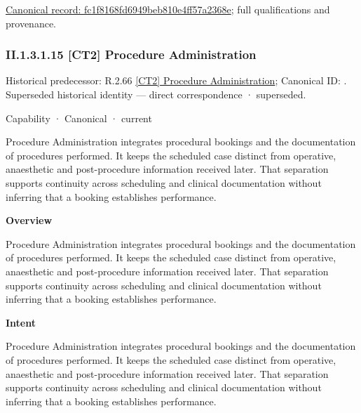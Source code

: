 {\footnotesize \href{../../../../continuum/strategy/capability/feature/fc1f8168fd6949beb810e4ff57a2368e.md}{Canonical record: fc1f8168fd6949beb810e4ff57a2368e}; full qualifications and provenance.}\par
\subsubsection*{II.1.3.1.15 [CT2] Procedure Administration}
\label{navigation:II.1.3.1.15}

{\small Historical predecessor: R.2.66 \hyperref[element:466a4057001846bb8ae0481453d3e410]{[CT2] Procedure Administration}; Canonical ID: \texttt{}. Superseded historical identity — direct correspondence · superseded.}\par
\label{element:649dd7cc26094e539386a050086dfb91}
{\small Capability · Canonical · current}\par

Procedure Administration integrates procedural bookings and the documentation of procedures performed. It keeps the scheduled case distinct from operative, anaesthetic and post-procedure information received later. That separation supports continuity across scheduling and clinical documentation without inferring that a booking establishes performance.



\textbf{Overview}



Procedure Administration integrates procedural bookings and the documentation of procedures performed. It keeps the scheduled case distinct from operative, anaesthetic and post-procedure information received later. That separation supports continuity across scheduling and clinical documentation without inferring that a booking establishes performance.



\textbf{Intent}



Procedure Administration integrates procedural bookings and the documentation of procedures performed. It keeps the scheduled case distinct from operative, anaesthetic and post-procedure information received later. That separation supports continuity across scheduling and clinical documentation without inferring that a booking establishes performance.



